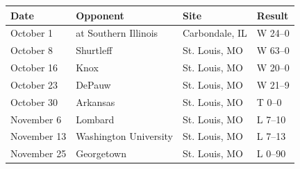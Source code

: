 \documentclass{article}
\begin{document}
\begin{tabular}{llll}
\toprule
Date & Opponent & Site & Result \\
\midrule
October 1 & at Southern Illinois & Carbondale, IL & W 24–0 \\
October 8 & Shurtleff & St. Louis, MO & W 63–0 \\
October 16 & Knox & St. Louis, MO & W 20–0 \\
October 23 & DePauw & St. Louis, MO & W 21–9 \\
October 30 & Arkansas & St. Louis, MO & T 0–0 \\
November 6 & Lombard & St. Louis, MO & L 7–10 \\
November 13 & Washington University & St. Louis, MO & L 7–13 \\
November 25 & Georgetown & St. Louis, MO & L 0–90 \\
\bottomrule
\end{tabular}
\end{document}
